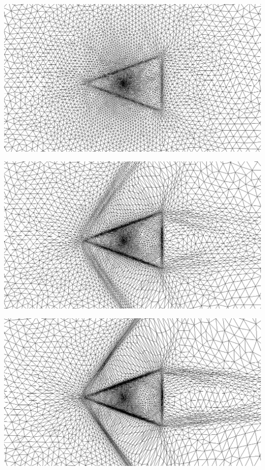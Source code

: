 \begingroup
	\begin{minipage}[t]{.5\linewidth}
		\centering
		\includegraphics[scale=.15]{Bordeaux/figures/AdapPhysique/dom4bI0.png}
	\end{minipage}
	\hfill
	\begin{minipage}[t]{.5\linewidth}
		\centering
		\includegraphics[scale=.15]{Bordeaux/figures/AdapPhysique/dom4bI1.png}
	\end{minipage}
	\begin{minipage}[t]{1.\linewidth}
		\centering
		\includegraphics[scale=.15]{Bordeaux/figures/AdapPhysique/dom4bI2.png}
	\end{minipage}
\endgroup


